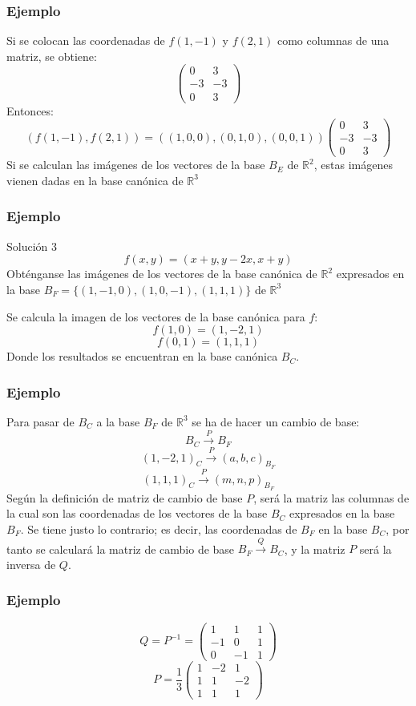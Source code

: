 \documentclass{beamer}
\begin{document}
    \begin{frame}
  \frametitle{Ejemplo}
Si se colocan las coordenadas de $f(1,-1)$ y $f(2,1)$ como columnas de una matriz, se obtiene:
 \[\left(\begin{array}{rr}0 & 3 \\-3 & -3 \\0 & 3\end{array}\right)\]
Entonces:
 \[ (f(1,-1), f(2,1)) = ((1,0,0),(0,1,0),(0,0,1)) \left(\begin{array}{rr}0 & 3 \\-3 & -3 \\0 & 3\end{array}\right)\]
  Si se calculan las im\'agenes de los vectores de la base $B_E$ de $\mathbb R^2$, estas im\'agenes vienen dadas en la base can\'onica de $\mathbb R^3$
   \end{frame}
   
         \begin{frame}
  \frametitle{Ejemplo}
 \begin{block}{Soluci\'on 3} 
$$f(x,y) = (x+y, y-2x, x+y)$$
Obt\'enganse las im\'agenes de los vectores de la base can\'onica de $\mathbb R^2$ expresados en la base $B_F=\{(1,-1,0),(1,0,-1),(1,1,1)\}$ de $\mathbb R^3$
 \end{block} 
Se calcula la imagen de los vectores de la base can\'onica para $f$: 
 \[f(1,0) = (1,-2,1)\]
 \[f(0,1) = (1,1,1)\]
 Donde los resultados se encuentran en la base can\'onica $B_C$.
  \end{frame}
   
\begin{frame}
  \frametitle{Ejemplo}
Para pasar de $B_C$ a la base $B_F$ de $\mathbb R^3$ se ha de hacer un cambio de base:
\[B_C\xrightarrow{P}B_F\]
\[(1,-2,1)_C\xrightarrow{P}(a,b,c)_{B_F}\]
\[(1,1,1)_C\xrightarrow{P}(m,n,p)_{B_F}\]
Seg\'un la definici\'on de matriz de cambio de base $P$, ser\'a la matriz las columnas de la cual son las coordenadas de los vectores de la base $B_C$ expresados en la base $B_F$. Se tiene justo lo contrario; es decir, las coordenadas de $B_F$ en la base $B_C$, por tanto se calcular\'a la matriz de cambio de base $B_F\xrightarrow{Q}B_C$, y la matriz $P$ ser\'a la inversa de $Q$.

  \end{frame}
  
  \begin{frame}
  \frametitle{Ejemplo}
\[Q = P^{-1} = \left(\begin{array}{rrr}1 & 1 & 1 \\-1 & 0 & 1 \\0 & -1 & 1\end{array}\right)\]
\[ P= \frac{1}{3} \left(\begin{array}{rrr}1 & -2 & 1 \\1 & 1 & -2 \\1 & 1 & 1\end{array}\right)\]
  \end{frame}
  
\end{document}
